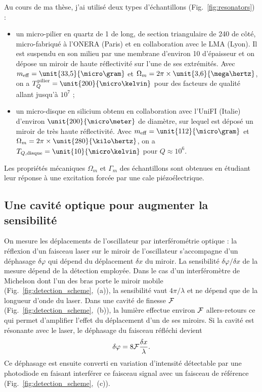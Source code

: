 \documentclass[12pt,a4paper]{article}
\begin{document}
Au cours de ma thèse, j'ai utilisé deux types d'échantillons (Fig.~\ref{fig:resonators}) :
\begin{itemize}
\item un micro-pilier en quartz de \unit{1}{\milli\meter} de long, de section triangulaire de \unit{240}{\micro\meter} de côté, micro-fabriqué à l'ONERA (Paris) et en collaboration avec le LMA (Lyon).
Il est suspendu en son milieu par une membrane d'environ \unit{10}{\micro\meter} d'épaisseur et on dépose un miroir de haute réflectivité sur l'une de ses extrémités.
Avec $m_\mathrm{eff}=\unit{33{,}5}{\micro\gram}$ et $\Omega_m=2\pi\times\unit{3{,}6}{\mega\hertz}$, on a $T_{Q}^\mathrm{pilier} = \unit{200}{\micro\kelvin}$ pour des facteurs de qualité allant jusqu'à $10^7$ ;
\item un micro-disque en silicium obtenu en collaboration avec l'UniFI (Italie) d'environ $\unit{200}{\micro\meter}$ de diamètre, sur lequel est déposé un miroir de très haute réflectivité.
Avec $m_\mathrm{eff}=\unit{112}{\micro\gram}$ et $\Omega_m=2\pi\times\unit{280}{\kilo\hertz}$, on a $T_{Q,\mathrm{disque}} = \unit{10}{\micro\kelvin}$ pour $Q\approx10^6$.
\end{itemize}
Les propriétés mécaniques $\Omega_m$ et $\Gamma_m$ des échantillons sont obtenues en étudiant leur réponse à une excitation forcée par une cale piézoélectrique.

\subsection{Une cavité optique pour augmenter la sensibilité}
\label{sec:cavity}

On mesure les déplacements de l'oscillateur par interférométrie optique : la réflexion d'un faisceau laser sur le miroir de l'oscillateur s'accompagne d'un déphasage $\delta\varphi$ qui dépend du déplacement $\delta x$ du miroir.
La sensibilité $\delta\varphi / \delta x$ de la mesure dépend de la détection employée.
Dans le cas d'un interféromètre de Michelson dont l'un des bras porte le miroir mobile (Fig.~\ref{fig:detection_scheme},~(a)), la sensibilité vaut $4\pi/\lambda$ et ne dépend que de la longueur d'onde du laser.
Dans une cavité de finesse $\cal{F}$ (Fig.~\ref{fig:detection_scheme},~(b)), la lumière effectue environ $\cal{F}$ allers-retours ce qui permet d'amplifier l'effet du déplacement d'un de ses miroirs.
Si la cavité est résonante avec le laser, le déphasage du faisceau réfléchi devient
\begin{equation}
\delta \varphi = 8{\cal{F}}\frac{\delta x}{\lambda}.
\end{equation}
Ce déphasage est ensuite converti en variation d'intensité détectable par une photodiode en faisant interférer ce faisceau signal avec un faisceau de référence (Fig.~\ref{fig:detection_scheme},~(c)).
\end{document}
